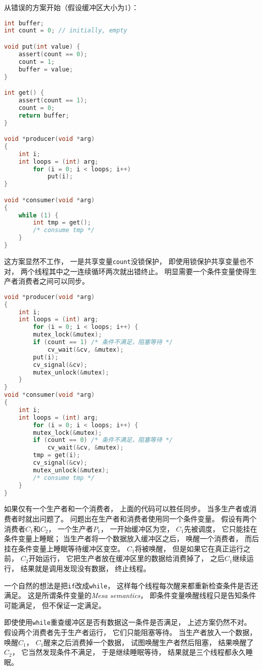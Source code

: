从错误的方案开始（假设缓冲区大小为1）：
\begin{lstlisting}[language=C]
int buffer;
int count = 0; // initially, empty

void put(int value) {
	assert(count == 0);
	count = 1;
	buffer = value;
}

int get() {
	assert(count == 1);
	count = 0;
	return buffer;
}

void *producer(void *arg)
{
	int i;
	int loops = (int) arg;
        for (i = 0; i < loops; i++)
        	put(i);
}

void *consumer(void *arg)
{
	while (1) {
		int tmp = get();
		/* consume tmp */
	}
}
\end{lstlisting}
这方案显然不工作，
一是共享变量\verb|count|没锁保护，
即使用锁保护共享变量也不对，
两个线程其中之一连续循环两次就出错终止。
明显需要一个条件变量使得生产者消费者之间可以同步。
\begin{lstlisting}[language=C]
void *producer(void *arg)
{
	int i;
	int loops = (int) arg;
        for (i = 0; i < loops; i++) {
		mutex_lock(&mutex);
		if (count == 1) /* 条件不满足，阻塞等待 */
			cv_wait(&cv, &mutex);
		put(i);
		cv_signal(&cv);
		mutex_unlock(&mutex);
	}
}
void *consumer(void *arg)
{
	int i;
	int loops = (int) arg;
        for (i = 0; i < loops; i++) {
		mutex_lock(&mutex);
		if (count == 0) /* 条件不满足，阻塞等待 */
			cv_wait(&cv, &mutex);
		tmp = get(i);
		cv_signal(&cv);
		mutex_unlock(&mutex);
		/* consume tmp */
	}
}
\end{lstlisting}
如果仅有一个生产者和一个消费者，
上面的代码可以胜任同步。
当多生产者或消费者时就出问题了。
问题出在生产者和消费者使用同一个条件变量。
假设有两个消费者$C_1$和$C_2$，
一个生产者$P_1$，
一开始缓冲区为空，
$C_1$先被调度，
它只能挂在条件变量上睡眠；
当生产者将一个数据放入缓冲区之后，
唤醒一个消费者，
而后挂在条件变量上睡眠等待缓冲区变空。
$C_1$将被唤醒，
但是如果它在真正运行之前，
$C_2$开始运行，
它把生产者放在缓冲区里的数据给消费掉了，
之后$C_1$继续运行，
结果就是调用发现没有数据，
终止线程。

一个自然的想法是把\verb|if|改成\verb|while|，
这样每个线程每次醒来都重新检查条件是否还满足。
这是所谓条件变量的{\em Mesa semantics}，
即条件变量唤醒线程只是告知条件可能满足，
但不保证一定满足。

即使使用\verb|while|重查缓冲区是否有数据这一条件是否满足，
上述方案仍然不对。
假设两个消费者先于生产者运行，
它们只能阻塞等待。
当生产者放入一个数据，
唤醒$C_1$，
$C_1$醒来之后消费掉一个数据，
试图唤醒生产者然后阻塞，
结果唤醒了$C_2$，
它当然发现条件不满足，
于是继续睡眠等待，
结果就是三个线程都永久睡眠。

